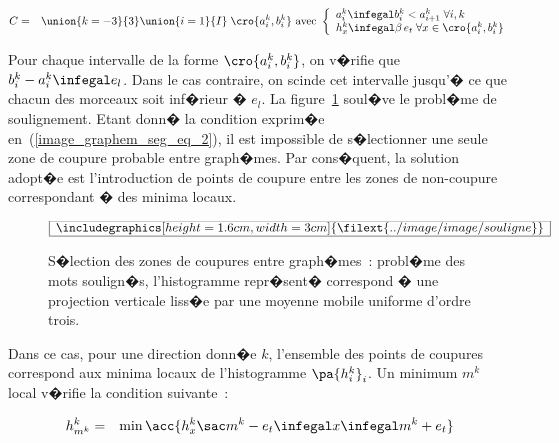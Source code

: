             \begin{eqnarray}
            C &=& \union{k=-3}{3} \union{i=1}{I} \; \cro{a_i^k, b_i^k} 
                                            \text{ avec } \left\{ \begin{array}{l}
                                                                a_i^k \infegal b_i^k < a^k_{i+1} \; \forall i,k \\
                                                                h_x^k \infegal \beta \, e_t \; \forall x \in \cro{a_i^k, b_i^k}
                                                                \end{array} \right.
            \label{image_graphem_seg_eq_2}
            \end{eqnarray}



Pour chaque intervalle de la forme $\cro{a_i^k, b_i^k}$, on v�rifie que $b_i^k - a_i^k \infegal e_l$. Dans le cas contraire, on scinde cet intervalle jusqu'� ce que chacun des morceaux soit inf�rieur � $e_l$. La figure~\ref{image_graphem_zone_coupure_soulignement} soul�ve le probl�me de soulignement. Etant donn� la condition exprim�e en~(\ref{image_graphem_seg_eq_2}), il est impossible de s�lectionner une seule zone de coupure probable entre graph�mes. Par cons�quent, la solution adopt�e est l'introduction de points de coupure entre les zones de non-coupure correspondant � des minima locaux. 

            \begin{figure}[ht]
        $$\frame{$\begin{array}[c]{c}\includegraphics[height=1.6cm, width=3cm]
        {\filext{../image/image/souligne}}\end{array}$}$$
        \caption{    S�lection des zones de coupures entre graph�mes~: probl�me des mots soulign�s,
                            l'histogramme repr�sent� correspond � une projection verticale liss�e par une 
                            moyenne mobile uniforme d'ordre trois.}
        \label{image_graphem_zone_coupure_soulignement}
            \end{figure}
            
Dans ce cas, pour une direction donn�e $k$, l'ensemble des points de coupures correspond aux minima locaux de l'histogramme $\pa{h_i^k}_i$. Un minimum $m^k$ local v�rifie la condition suivante~:

            \begin{eqnarray}
            h^k_{m^k} &=& \min \acc{ h_x^k \sac  m^k - e_t \infegal x \infegal m^k + e_t } 
            \label{image_graphem_seg_eq_2_prime}
            \end{eqnarray}


